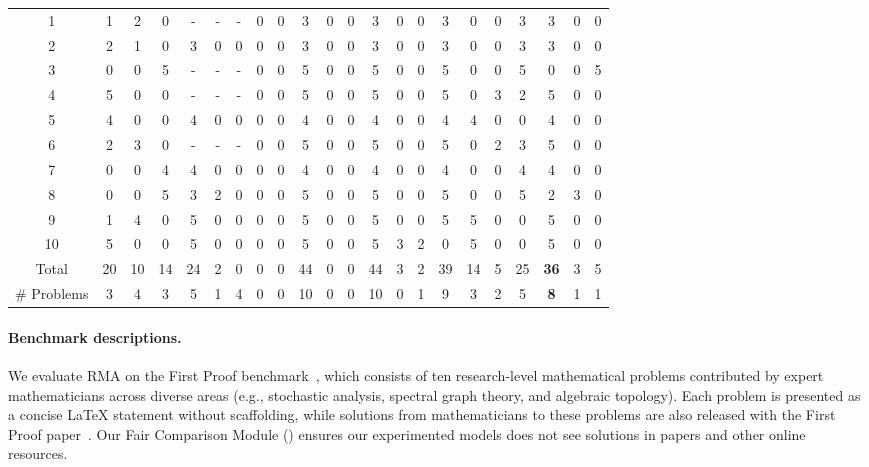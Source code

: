 \documentclass{article}
\newcommand{\modelname}{\textsc{RMA}\xspace}
\begin{document}
\begin{table}[t]
{\begin{tabular}{c|CCC|CCC|CCC|CCC|CCC|CCC|CCC}
1 & 1&2&0 & -&-&- & 0&0&3 & 0&0&3 & 0&0&3 & 0&0&3 & 3&0&0 \\
2 & 2&1&0 & 3&0&0 & 0&0&3 & 0&0&3 & 0&0&3  & 0&0&3 & 3&0&0 \\
3 & 0&0&5 & -&-&- & 0&0&5 & 0&0&5 & 0&0&5 & 0&0&5 & 0&0&5 \\
4 & 5&0&0 & -&-&- & 0&0&5 & 0&0&5 & 0&0&5 & 0&3&2 & 5&0&0 \\
5 & 4&0&0 & 4&0&0 & 0&0&4 & 0&0&4 & 0&0&4 & 4&0&0 & 4&0&0 \\
6 & 2&3&0 & -&-&- & 0&0&5 & 0&0&5 & 0&0&5 & 0&2&3 & 5&0&0 \\
7 & 0&0&4 & 4&0&0 & 0&0&4 & 0&0&4 & 0&0&4 & 0&0&4 & 4&0&0 \\
8 & 0&0&5 & 3&2&0 & 0&0&5 & 0&0&5 & 0&0&5 & 0&0&5 & 2&3&0 \\
9 & 1&4&0 & 5&0&0 & 0&0&5 & 0&0&5 & 0&0&5 & 5&0&0 & 5&0&0 \\
10& 5&0&0 & 5&0&0 & 0&0&5 & 0&0&5 & 3&2&0 & 5&0&0 & 5&0&0 \\
\midrule
Total 
& 20&10&14 
& 24&2&0
& 0&0&44 
& 0&0&44 
& 3&2&39 
& 14&5&25 
& \textbf{36}&3&5 \\
\midrule
{}
\# Problems
& 3&4&3 & 5&1&4 & 0&0&10& 0&0&10& 0&1&9 & 3&2&5 & \textbf{8}&1&1 \\
\bottomrule
\end{tabular}
}
\label{tab-correctness}
\vspace{-10pt}
\end{table}

\vspace{-7pt}
\paragraph{Benchmark descriptions.}
We evaluate \modelname on the First Proof benchmark~\cite{abouzaid2026first}, which consists of ten research-level mathematical problems contributed by expert mathematicians across diverse areas (e.g., stochastic analysis, spectral graph theory, and algebraic topology). Each problem is presented as a concise LaTeX statement without scaffolding, while solutions from mathematicians to these problems are also released with the First Proof paper~\cite{abouzaid2026first}. Our Fair Comparison Module () ensures our experimented models does not see solutions in papers and other online resources.
\vspace{-5pt}
\end{document}
